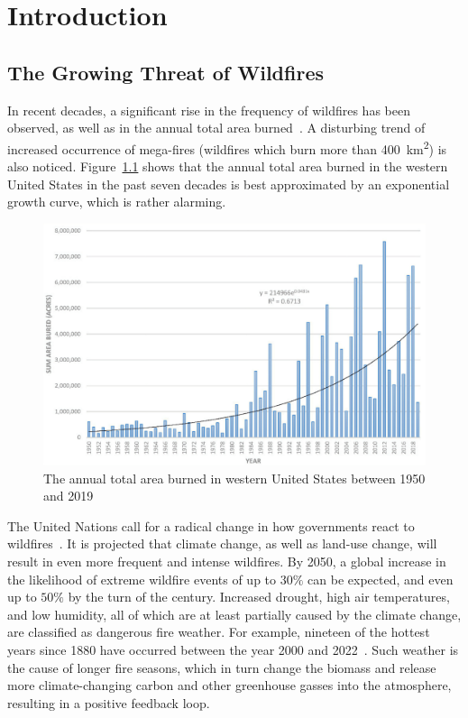 \chapter{Introduction}

\section{The Growing Threat of Wildfires}

In recent decades, a significant rise in the frequency of wildfires has been observed, as well as in the annual total area burned~\cite{Weber/WildfireTrends}.
A disturbing trend of increased occurrence of mega-fires (wildfires which burn more than \SI{400}{\km\squared}) is also noticed.
Figure~\ref{fig:west-usa-area-burned} shows that the annual total area burned in the western United States in the past seven decades is best approximated by an exponential growth curve, which is rather alarming.

\begin{figure}[tb]
    \centering
    \includegraphics[width=0.9\linewidth]{img/west-usa-area-burned.jpg}
    \caption{The annual total area burned in western United States between 1950 and 2019~\cite{Weber/WildfireTrends}}
    \label{fig:west-usa-area-burned}
\end{figure}

The United Nations call for a radical change in how governments react to wildfires~\cite{UN/FiresReport}.
It is projected that climate change, as well as land-use change, will result in even more frequent and intense wildfires.
By 2050, a global increase in the likelihood of extreme wildfire events of up to $30\%$ can be expected, and even up to $50\%$ by the turn of the century.
Increased drought, high air temperatures, and low humidity, all of which are at least partially caused by the climate change, are classified as dangerous fire weather.
For example, nineteen of the hottest years since 1880 have occurred between the year 2000 and 2022~\cite{NASA/Temperature}.
Such weather is the cause of longer fire seasons, which in turn change the biomass and release more climate-changing carbon and other greenhouse gasses into the atmosphere, resulting in a positive feedback loop.

